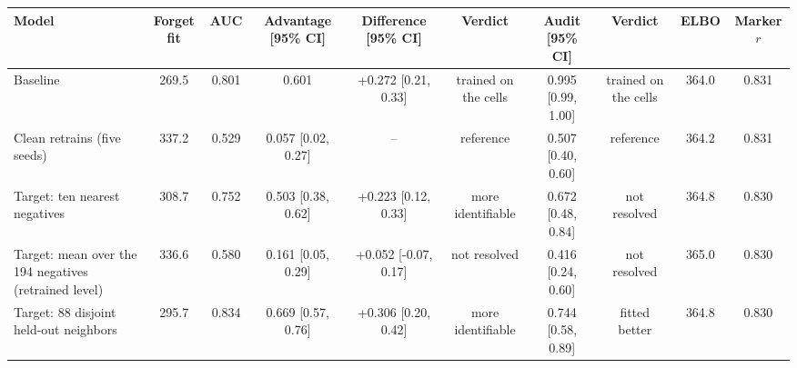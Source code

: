 \begin{tabular}{lccccccccc}
\toprule
Model & Forget fit & AUC & Advantage [95\% CI] & Difference [95\% CI] & Verdict & Audit [95\% CI] & Verdict & ELBO & Marker $r$ \\
\midrule
Baseline & 269.5 & 0.801 & 0.601 & +0.272 [0.21, 0.33] & trained on the cells & 0.995 [0.99, 1.00] & trained on the cells & 364.0 & 0.831 \\
Clean retrains (five seeds) & 337.2 & 0.529 & 0.057 [0.02, 0.27] & -- & reference & 0.507 [0.40, 0.60] & reference & 364.2 & 0.831 \\
\midrule
Target: ten nearest negatives & 308.7 & 0.752 & 0.503 [0.38, 0.62] & +0.223 [0.12, 0.33] & more identifiable & 0.672 [0.48, 0.84] & not resolved & 364.8 & 0.830 \\
Target: mean over the 194 negatives (retrained level) & 336.6 & 0.580 & 0.161 [0.05, 0.29] & +0.052 [-0.07, 0.17] & not resolved & 0.416 [0.24, 0.60] & not resolved & 365.0 & 0.830 \\
Target: 88 disjoint held-out neighbors & 295.7 & 0.834 & 0.669 [0.57, 0.76] & +0.306 [0.20, 0.42] & more identifiable & 0.744 [0.58, 0.89] & fitted better & 364.8 & 0.830 \\
\bottomrule
\end{tabular}
